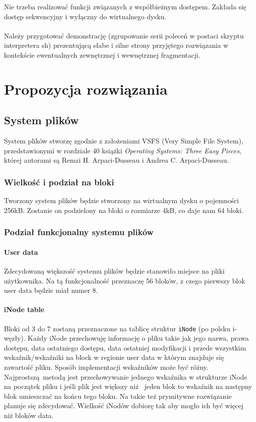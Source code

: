 \documentclass{mwrep}
\begin{document}
\indent{} Nie trzeba realizować funkcji związanych z współbieżnym dostępem. Zakłada
się dostęp sekwencyjny i wyłączny do wirtualnego dysku.\\
\\
\indent{} Należy przygotować demonstrację (zgrupowanie serii poleceń w postaci skryptu
interpretera sh) prezentującą słabe i silne strony przyjętego rozwiązania w
kontekście ewentualnych zewnętrznej i wewnętrznej fragmentacji.   

\chapter{Propozycja rozwiązania}
\section{System plików}
System plików stworzę zgodnie z założeniami VSFS (Very Simple File System), przedstawionymi
w rozdziale 40 książki \emph{Operating Systems: Three Easy Pieces}, której autorami są  Remzi H. Arpaci-Dusseau 
i Andrea C. Arpaci-Dusseau.  

\subsection{Wielkość i podział na bloki}
Tworzony system plików będzie stworzony na wirtualnym dysku o pojemności 256kB. Zostanie on podzielony na bloki o 
rozmiarze 4kB, co daje nam 64 bloki.

\subsection{Podział funkcjonalny systemu plików}

\subsubsection{User data}
Zdecydowaną większość systemu plików będzie stanowiło miejsce na pliki użytkownika. Na tą funkcjonalność przeznaczę 56 
bloków, z czego pierwszy blok user data będzie miał numer 8. 

\subsubsection{iNode table}
Bloki od 3 do 7 zostaną przeznaczone na tablicę struktur \texttt{iNode} (po polsku i-węzły). 
Każdy iNode przechowuję informację o pliku takie
jak jego nazwa, prawa dostępu, data ostatniego dostępu, data ostatniej modyfikacji i przede wszystkim wskaźnik/wskaźniki na block w regionie user data 
w którym znajduje się zawartość pliku. Sposób implementacji wskaźników może być różny. Najprostszą metodą jest przechowywanie jednego wskaźnika
w strukturze iNode na początek pliku i jeśli plik jest większy niż 
jeden blok to wskaźnik na następny blok umieszczać na końcu tego bloku. Na takie też prymitywne rozwiązanie planuje się
zdecydować. Wielkość iNodów dobiorę tak aby mogło ich być więcej niż bloków data. 
\end{document}
